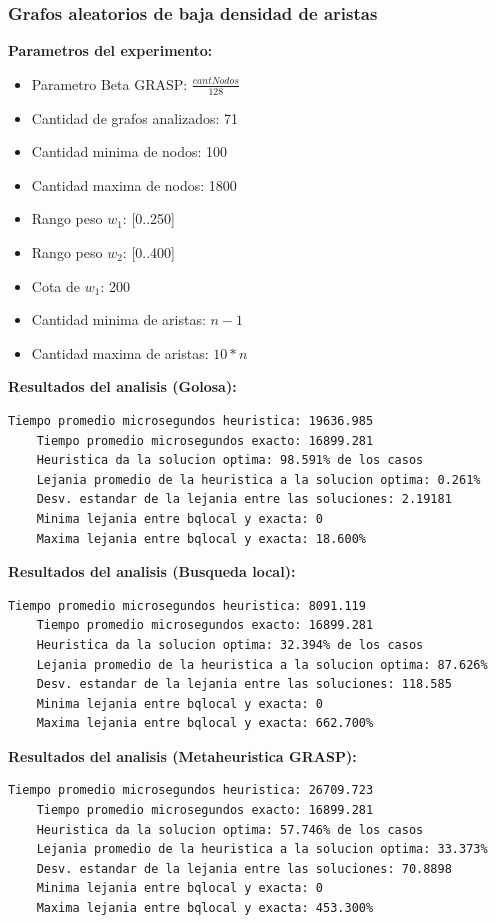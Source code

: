 \subsubsection{Grafos aleatorios de baja densidad de aristas}
\textbf{Parametros del experimento:}
\begin{itemize}
	\item Parametro Beta GRASP: $\frac{cantNodos}{128}$
	\item Cantidad de grafos analizados: 71
	\item Cantidad minima de nodos: 100
	\item Cantidad maxima de nodos: 1800
	\item Rango peso $w_1$: [0..250]
	\item Rango peso $w_2$: [0..400]
	\item Cota de $w_1$: 200
	\item Cantidad minima de aristas: $n-1$
	\item Cantidad maxima de aristas: $10*n$
\end{itemize}

\vspace{1cm}

\textbf{Resultados del analisis (Golosa):}
\begin{lstlisting}[frame=single]	
	Tiempo promedio microsegundos heuristica: 19636.985
	Tiempo promedio microsegundos exacto: 16899.281
	Heuristica da la solucion optima: 98.591% de los casos
	Lejania promedio de la heuristica a la solucion optima: 0.261%
	Desv. estandar de la lejania entre las soluciones: 2.19181
	Minima lejania entre bqlocal y exacta: 0
	Maxima lejania entre bqlocal y exacta: 18.600%
\end{lstlisting}

\textbf{Resultados del analisis (Busqueda local):}
\begin{lstlisting}[frame=single]	
	Tiempo promedio microsegundos heuristica: 8091.119
	Tiempo promedio microsegundos exacto: 16899.281
	Heuristica da la solucion optima: 32.394% de los casos
	Lejania promedio de la heuristica a la solucion optima: 87.626%
	Desv. estandar de la lejania entre las soluciones: 118.585
	Minima lejania entre bqlocal y exacta: 0
	Maxima lejania entre bqlocal y exacta: 662.700%
\end{lstlisting}

\textbf{Resultados del analisis (Metaheuristica GRASP):}
\begin{lstlisting}[frame=single]	
	Tiempo promedio microsegundos heuristica: 26709.723
	Tiempo promedio microsegundos exacto: 16899.281
	Heuristica da la solucion optima: 57.746% de los casos
	Lejania promedio de la heuristica a la solucion optima: 33.373%
	Desv. estandar de la lejania entre las soluciones: 70.8898
	Minima lejania entre bqlocal y exacta: 0
	Maxima lejania entre bqlocal y exacta: 453.300%
\end{lstlisting}

